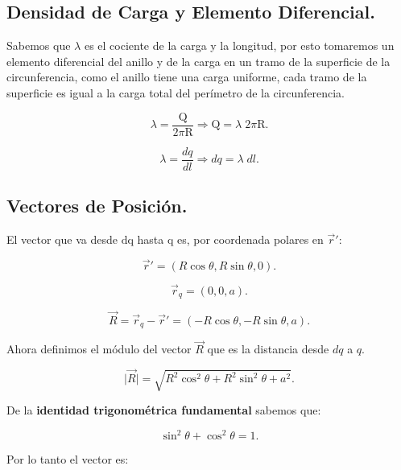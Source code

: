 \documentclass[a4paper,12pt]{article} %
\begin{document}
\subsection{Densidad de Carga y Elemento Diferencial.}

\vspace{\baselineskip}

\begin{justify}
	Sabemos que \(\lambda\) es el cociente de la carga y la longitud, por esto tomaremos un elemento diferencial del anillo y de la carga en un
	tramo de la superficie de la circunferencia, como el anillo tiene una carga uniforme, cada tramo de la superficie es igual a la carga total del
	perímetro de la circunferencia.
\end{justify}

\[\lambda = \frac{\mathrm{Q}}{2 \pi \mathrm{R}} \Rightarrow \mathrm{Q} = \lambda \; 2\pi \mathrm{R}. \]

\[\lambda = \frac{dq}{dl} \Rightarrow dq = \lambda \; dl. \]

\subsection{Vectores de Posición.}

\begin{justify}
	El vector que va desde \(\mathrm{dq}\) hasta \(\mathrm{q}\) es, por coordenada polares en \(\vec{r}'\):
\end{justify}

\[ \vec{r}' = \left( R \cos \theta, R \sin \theta, 0 \right). \]

\[ \vec{r}_q = \left( 0,0,a \right).\]

\[ \vec{R} = \vec{r}_q - \vec{r}' = \left( - R \cos \theta, -R \sin \theta, a \right). \]

\begin{justify}
	Ahora definimos el módulo del vector \( \vec{R}\) que es la distancia desde \(dq\) a \(q\).
\end{justify}

\[ \vert \vec{R} \vert = \sqrt{R^2 \cos^2 \theta + R^2 \sin^2 \theta + a^2}.  \]

\begin{justify}
	De la \textbf{identidad trigonométrica fundamental} sabemos que:
\end{justify}

\[ \sin^2 \theta + \cos^2 \theta = 1.\]

\begin{justify}
	Por lo tanto el vector es:
\end{justify}
\end{document}

